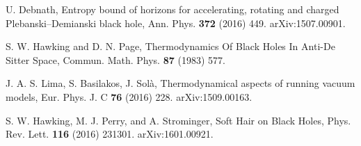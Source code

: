 \documentclass[prd,onecolumn,notitlepage,amsmath,nofootinbib,superscriptaddress,showpacs,showkeys]{revtex4-1}
\begin{document}
\begin{thebibliography}{99}
U. Debnath, Entropy bound of horizons for accelerating,
rotating and charged Plebanski--Demianski black hole, Ann. Phys. \textbf{372}
(2016) 449. arXiv:1507.00901.

S. W. Hawking and D. N. Page, Thermodynamics Of
Black Holes In Anti-De Sitter Space, Commun. Math. Phys. \textbf{87}
(1983) 577.

J. A. S. Lima, S. Basilakos, J. Sol\`{a}, Thermodynamical
aspects of running vacuum models, Eur. Phys. J. C \textbf{76} (2016)
228. arXiv:1509.00163.

S. W. Hawking, M. J. Perry, and A. Strominger, Soft
Hair on Black Holes, Phys. Rev. Lett. \textbf{116} (2016) 231301.
arXiv:1601.00921. \end{thebibliography}
\end{document}
